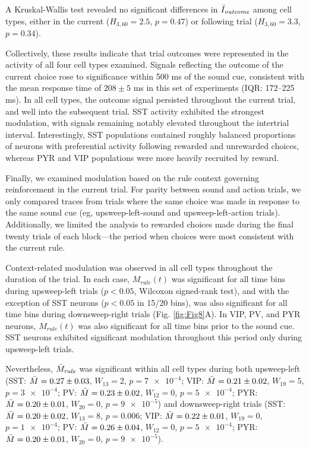 A Kruskal-Wallis test revealed no significant differences in $\Bar{I}_{\mathit{outcome}}$ among cell types, either in the current ($H_{3,60}=2.5$, $p=0.47$) or following trial ($H_{3,60}=3.3$, $p=0.34$). 

Collectively, these results indicate that trial outcomes were represented in the activity of all four cell types examined. Signals reflecting the outcome of the current choice rose to significance within 500 ms of the sound cue, consistent with the mean response time of $208 \pm 5$ ms in this set of experiments (IQR: 172--225 ms). In all cell types, the outcome signal persisted throughout the current trial, and well into the subsequent trial. SST activity exhibited the strongest modulation, with signals remaining notably elevated throughout the intertrial interval. Interestingly, SST populations contained roughly balanced proportions of neurons with preferential activity following rewarded and unrewarded choices, whereas PYR and VIP populations were more heavily recruited by reward.

Finally, we examined modulation based on the rule context governing reinforcement in the current trial. For parity between sound and action trials, we only compared traces from trials where the same choice was made in response to the same sound cue (eg, upsweep-left-sound and upsweep-left-action trials). Additionally, we limited the analysis to rewarded choices made during the final twenty trials of each block---the period when choices were most consistent with the current rule.

Context-related modulation was observed in all cell types throughout the duration of the trial. In each case, $M_{\mathit{rule}}(t)$ was significant for all time bins during upsweep-left trials ($p<0.05$, Wilcoxon signed-rank test), and with the exception of SST neurons ($p<0.05$ in 15/20 bins), was also significant for all time bins during downsweep-right trials (Fig. \ref{fig:Fig8}A). In VIP, PV, and PYR neurons, $M_{\mathit{rule}}(t)$ was also significant for all time bins prior to the sound cue. SST neurons exhibited significant modulation throughout this period only during upsweep-left trials.



Nevertheless, $\Bar{M}_{\mathit{rule}}$ was significant within all cell types during both upsweep-left (SST: $\Bar{M}=0.27\pm0.03$, $W_{13}=2$, $p=\num{7e-4}$; VIP: $\Bar{M}=0.21\pm0.02$, $W_{19}=5$, $p=\num{3e-4}$; PV: $\Bar{M}=0.23\pm0.02$, $W_{12}=0$, $p=\num{5e-4}$; PYR: $\Bar{M}=0.20\pm0.01$, $W_{20}=0$, $p=\num{9e-5}$) and downsweep-right trials (SST: $\Bar{M}=0.20\pm0.02$, $W_{13}=8$, $p=\num{0.006}$; VIP: $\Bar{M}=0.22\pm0.01$, $W_{19}=0$, $p=\num{1e-4}$; PV: $\Bar{M}=0.26\pm0.04$, $W_{12}=0$, $p=\num{5e-4}$; PYR: $\Bar{M}=0.20\pm0.01$, $W_{20}=0$, $p=\num{9e-5}$). 

